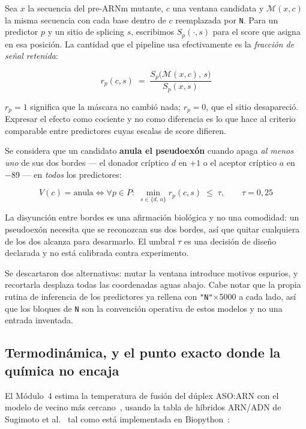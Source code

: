 \documentclass[11pt,a4paper]{article}
\begin{document}
Sea $x$ la secuencia del pre-ARNm mutante, $c$ una ventana candidata y $\mathcal{M}(x,c)$ la misma
secuencia con cada base dentro de $c$ reemplazada por \texttt{N}. Para un predictor $p$ y un sitio de
splicing $s$, escribimos $S_p(\cdot,s)$ para el score que asigna en esa posición. La cantidad que el
pipeline usa efectivamente es la \emph{fracción de señal retenida}:

\begin{equation}
r_p(c,s) \;=\; \frac{S_p\bigl(\mathcal{M}(x,c),\,s\bigr)}{S_p(x,s)}
\label{eq:retencion}
\end{equation}

$r_p = 1$ significa que la máscara no cambió nada; $r_p = 0$, que el sitio desapareció. Expresar el
efecto como cociente y no como diferencia es lo que hace al criterio comparable entre predictores
cuyas escalas de score difieren.

Se considera que un candidato \textbf{anula el pseudoexón} cuando apaga \emph{al menos uno} de sus
dos bordes --- el donador críptico $d$ en $+1$ o el aceptor críptico $a$ en $-89$ --- en
\emph{todos} los predictores:

\begin{equation}
V(c) = \text{anula} \iff \forall p \in P:\;
\min_{s \in \{d,\,a\}} r_p(c,s) \;\le\; \tau,
\qquad \tau = 0{,}25
\label{eq:veredicto}
\end{equation}

La disyunción entre bordes es una afirmación biológica y no una comodidad: un pseudoexón necesita que
se reconozcan sus dos bordes, así que quitar cualquiera de los dos alcanza para desarmarlo. El umbral
$\tau$ es una decisión de diseño declarada y no está calibrada contra experimento.

Se descartaron dos alternativas: mutar la ventana introduce motivos espurios, y recortarla desplaza
todas las coordenadas aguas abajo. Cabe notar que la propia rutina de inferencia de los predictores
ya rellena con \texttt{"N"}$\times$5000 a cada lado, así que los bloques de \texttt{N} son la
convención operativa de estos modelos y no una entrada inventada.

\subsection{Termodinámica, y el punto exacto donde la química no encaja}
\label{sec:termo}

El Módulo~4 estima la temperatura de fusión del dúplex ASO:ARN con el modelo de vecino más
cercano~\cite{santalucia1998}, usando la tabla de híbridos ARN/ADN de Sugimoto et
al.~\cite{sugimoto1995} tal como está implementada en Biopython~\cite{cock2009}:
\end{document}
